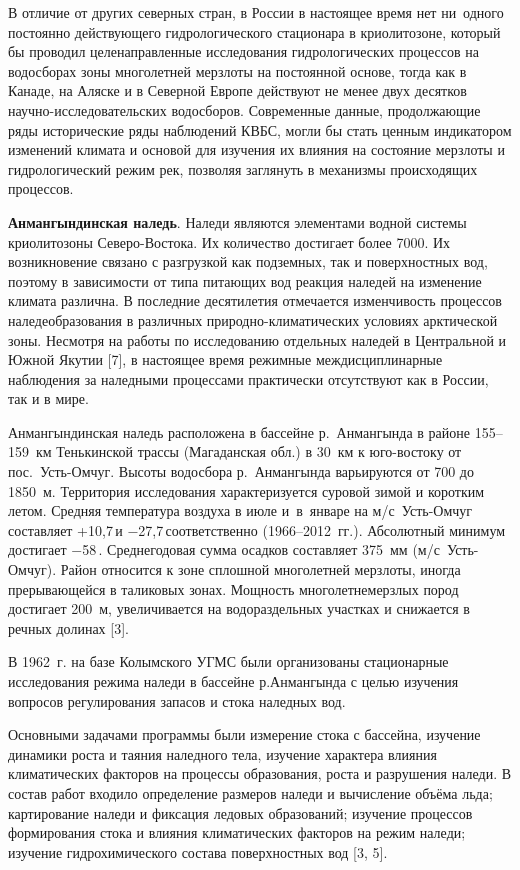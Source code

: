 В отличие от других северных стран, в России в настоящее время нет ни~одного постоянно действующего гидрологического стационара в криолитозоне, который бы проводил целенаправленные исследования гидрологических процессов на водосборах зоны многолетней мерзлоты на постоянной основе, тогда как в Канаде, на Аляске и в Северной Европе действуют не менее двух десятков научно-исследовательских водосборов. Современные данные, продолжающие ряды исторические ряды наблюдений КВБС, могли бы стать ценным индикатором изменений климата и основой для изучения их влияния на состояние мерзлоты и гидрологический режим рек, позволяя заглянуть в механизмы происходящих процессов.

\textbf{Анмангындинская наледь}. Наледи являются элементами водной системы криолитозоны Северо-Востока. Их количество достигает более 7000. Их возникновение связано с разгрузкой как подземных, так и поверхностных вод, поэтому в зависимости от типа питающих вод реакция наледей на изменение климата различна. В последние десятилетия отмечается изменчивость процессов наледеобразования в различных природно-климатических условиях арктической зоны. Несмотря на работы по исследованию отдельных наледей в Центральной и Южной Якутии [7], в настоящее время режимные междисциплинарные наблюдения за наледными процессами практически отсутствуют как в России, так и в мире.


Анмангындинская наледь расположена в бассейне р.~Анмангында в районе 155--159~км Тенькинской трассы (Магаданская обл.) в 30~км к юго-востоку от пос.~Усть-Омчуг. Высоты водосбора р.~Анмангында варьируются от 700 до 1850~м. Территория исследования характеризуется суровой зимой и коротким летом. Средняя температура воздуха в июле и~в~январе на м/с~Усть-Омчуг составляет +10,7\,\dgc  и $-$27,7\,\dgc соответственно (1966--2012~гг.). Абсолютный минимум достигает $-$58\,. Среднегодовая сумма осадков составляет 375~мм (м/с~Усть-Омчуг). Район относится к зоне сплошной многолетней мерзлоты, иногда прерывающейся в таликовых зонах. Мощность многолетнемерзлых пород достигает 200~м, увеличивается на водораздельных участках и снижается в речных долинах [3].

В 1962~г. на базе Колымского УГМС были организованы стационарные исследования режима наледи в бассейне р.Анмангында с целью изучения вопросов регулирования запасов и стока наледных вод.

Основными задачами программы были измерение стока с бассейна, изучение динамики роста и таяния наледного тела, изучение характера влияния климатических факторов на процессы образования, роста и разрушения наледи. В состав работ входило определение размеров наледи и вычисление объёма льда; картирование наледи и фиксация ледовых образований; изучение процессов формирования стока и влияния климатических факторов на режим наледи; изучение гидрохимического состава поверхностных вод [3, 5].

